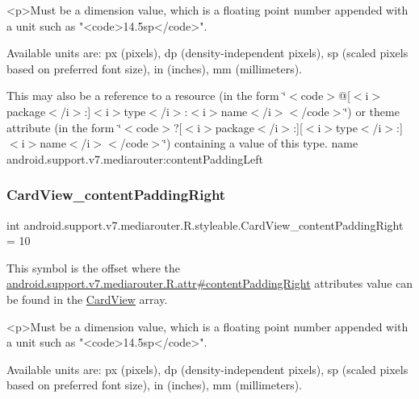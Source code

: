 \begin{DoxyVerb}      <p>Must be a dimension value, which is a floating point number appended with a unit such as "<code>14.5sp</code>".
\end{DoxyVerb}
 Available units are\+: px (pixels), dp (density-\/independent pixels), sp (scaled pixels based on preferred font size), in (inches), mm (millimeters). 

This may also be a reference to a resource (in the form \char`\"{}$<$code$>$@\mbox{[}$<$i$>$package$<$/i$>$\+:\mbox{]}$<$i$>$type$<$/i$>$\+:$<$i$>$name$<$/i$>$$<$/code$>$\char`\"{}) or theme attribute (in the form \char`\"{}$<$code$>$?\mbox{[}$<$i$>$package$<$/i$>$\+:\mbox{]}\mbox{[}$<$i$>$type$<$/i$>$\+:\mbox{]}$<$i$>$name$<$/i$>$$<$/code$>$\char`\"{}) containing a value of this type.  name android.\+support.\+v7.\+mediarouter\+:content\+Padding\+Left \mbox{\label{classandroid_1_1support_1_1v7_1_1mediarouter_1_1R_1_1styleable_adda6aa23539f7df612d220bb2a3f95b6}} 
\subsubsection{\texorpdfstring{Card\+View\+\_\+content\+Padding\+Right}{CardView\_contentPaddingRight}}
{\footnotesize\ttfamily int android.\+support.\+v7.\+mediarouter.\+R.\+styleable.\+Card\+View\+\_\+content\+Padding\+Right = 10\hspace{0.3cm}{\ttfamily [static]}}

This symbol is the offset where the \hyperlink{classandroid_1_1support_1_1v7_1_1mediarouter_1_1R_1_1attr_ad77e97d2c06c9038049d3d298e4d171d}{android.\+support.\+v7.\+mediarouter.\+R.\+attr\#content\+Padding\+Right} attribute\textquotesingle{}s value can be found in the \hyperlink{classandroid_1_1support_1_1v7_1_1mediarouter_1_1R_1_1styleable_a58720bc744e6374c25e81b8ae15a2c6a}{Card\+View} array.

\begin{DoxyVerb}      <p>Must be a dimension value, which is a floating point number appended with a unit such as "<code>14.5sp</code>".
\end{DoxyVerb}
 Available units are\+: px (pixels), dp (density-\/independent pixels), sp (scaled pixels based on preferred font size), in (inches), mm (millimeters). 

